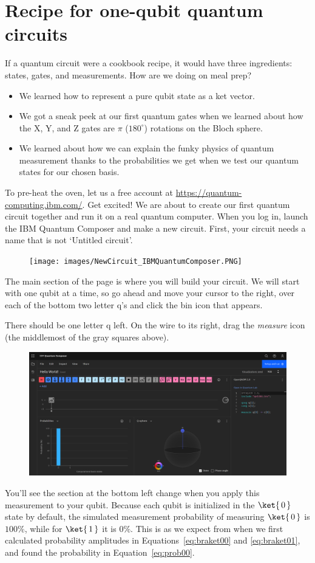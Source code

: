 \documentclass{article}
\theoremstyle{definition}
\newcommand{\kz}[1]{\ket{\,#1\,}}
\begin{document}
\newpage
\section{Recipe for one-qubit quantum circuits}
If a quantum circuit were a cookbook recipe, it would have three ingredients: states, gates, and measurements.
How are we doing on meal prep?
\begin{itemize}
	\item We learned how to represent a pure qubit state as a ket vector.
	\item We got a sneak peek at our first quantum gates when we learned about how the X, Y, and Z gates are $\pi$ ($180^{\circ}$) rotations on the Bloch sphere.
	\item We learned about how we can explain the funky physics of quantum measurement thanks to the probabilities we get when we test our quantum states for our chosen basis.
\end{itemize}
To pre-heat the oven, let us a free account at \url{https://quantum-computing.ibm.com/}.  Get excited!  We are about to create our first quantum circuit together and run it on a real quantum computer.
When you log in, launch the IBM Quantum Composer and make a new circuit.
First, your circuit needs a name that is not `Untitled circuit'.
\begin{figure}[H]
	\texttt{[image: images/NewCircuit\_IBMQuantumComposer.PNG]}
\end{figure}
The main section of the page is where you will build your circuit.  We will start with one qubit at a time, so go ahead and move your cursor to the right, over each of the bottom two letter q's and click the bin icon that appears.

There should be one letter q left.  On the wire to its right, drag the \textit{measure} icon (the middlemost of the gray squares above).
\begin{figure}[H]
	\includegraphics[width=\columnwidth]{images/Measure_IBMQuantumComposer.PNG}
\end{figure}
You'll see the section at the bottom left change when you apply this measurement to your qubit.  Because each qubit is initialized in the $\kz0$ state by default, the simulated measurement probability of measuring $\kz0$ is $100\%$, while for $\kz1$ it is $0\%$.  This is as we expect from when we first calculated probability amplitudes in Equations~\ref{eq:braket00} and \ref{eq:braket01}, and found the probability in Equation~\ref{eq:prob00}.
\end{document}
